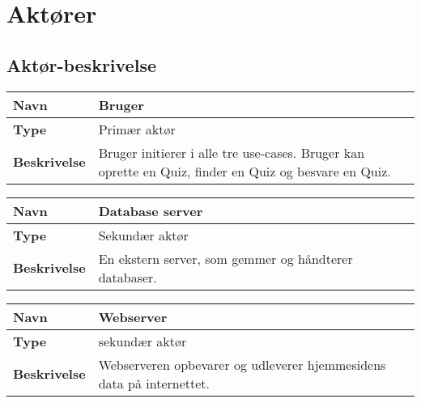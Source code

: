 \section{Aktører}




\subsection{Aktør-beskrivelse}

\begin{tabular}{|p{2cm}|p{12cm}|}

\hline 
\textbf{Navn} & Bruger \\ 
\hline 
\textbf{Type} & Primær aktør \\ 
\hline 
\textbf{Beskrivelse} & Bruger initierer i alle tre use-cases. Bruger kan oprette en Quiz, finder en Quiz og besvare en Quiz.\\ 
\hline 

\end{tabular} 

\begin{tabular}{|p{2cm}|p{12cm}|}

\hline 
\textbf{Navn} & Database server \\ 
\hline 
\textbf{Type} & Sekundær aktør \\ 
\hline 
\textbf{Beskrivelse} & En ekstern server, som gemmer og håndterer databaser.\\ 
\hline 

\end{tabular} 

\begin{tabular}{|p{2cm}|p{12cm}|}

\hline 
\textbf{Navn} & Webserver \\ 
\hline 
\textbf{Type} & sekundær aktør \\ 
\hline 
\textbf{Beskrivelse} & Webserveren opbevarer og udleverer hjemmesidens data på internettet.\\ 
\hline 

\end{tabular} 